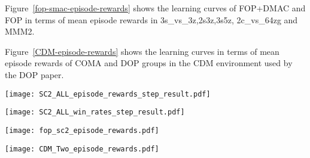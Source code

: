 \documentclass{article}
\begin{document}
	
	Figure~\ref{fop-smac-episode-rewards} shows the learning curves of FOP+DMAC and FOP in terms of mean episode rewards in 3s\_vs\_3z,2s3z,3s5z, 2c\_vs\_64zg and MMM2. 
	
	Figure~\ref{CDM-episode-rewards} shows the learning curves in terms of mean episode rewards of COMA and DOP groups in the CDM environment used by the DOP paper. 
	
	
	\begin{figure*}[t]
		\centering
		\texttt{[image: SC2\_ALL\_episode\_rewards\_step\_result.pdf]}
	    \vspace*{-0.6cm}
		\caption{Learning curves in terms of mean episode reward of COMA, MAAC, QMIX, and DOP groups in seven SMAC maps (each row corresponds to a map and each column corresponds to a group). }
		\label{SMAC--reward-curve}
		\vspace*{-0.2cm} 
	\end{figure*}
	


	\begin{figure*}[t]
		\setlength{\abovecaptionskip}{2pt}
		\centering
		\texttt{[image: SC2\_ALL\_win\_rates\_step\_result.pdf]}
		\vspace*{-0.6cm}
		\caption{Learning curves in terms of win rate of COMA, MAAC, QMIX, and DOP groups in seven SMAC maps (each row corresponds to a map and each column corresponds to a group). }
		\label{more-SMAC-curve}
	\end{figure*}
	
	\begin{figure*}[t]
		\setlength{\abovecaptionskip}{2pt}
		\centering
		\texttt{[image: fop\_sc2\_episode\_rewards.pdf]}
		\vspace*{-0.8cm}
		\caption{Learning curves in terms of mean episode rewards of FOP+DMAC and FOP in five SMAC maps (each column corresponds to a map).}
		\label{fop-smac-episode-rewards}
		\vspace*{-0.2cm} 
	\end{figure*}

	\begin{figure*}[t]
		\centering
		\texttt{[image: CDM\_Two\_episode\_rewards.pdf]}
		\vspace*{-0.4cm}
		\caption{Learning curves in terms of mean episode rewards of COMA and DOP groups in the CDM environment used by the DOP paper.}
		\label{CDM-episode-rewards}
		\vspace*{-0.2cm} 
	\end{figure*}
\end{document}
